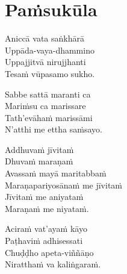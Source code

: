 
\clearpage

\section{Paṁsukūla}

\enlargethispage{\baselineskip}




Aniccā vata saṅkhārā\\
Uppāda-vaya-dhammino\\
Uppajjitvā nirujjhanti\\
Tesaṁ vūpasamo sukho.

Sabbe sattā maranti ca\\
Mariṁsu ca marissare\\
Tath'evāhaṁ marissāmi\\
N'atthi me ettha saṁsayo. 


Addhuvaṁ jīvitaṁ\\
Dhuvaṁ maraṇaṁ\\
Avassaṁ mayā maritabbaṁ\\
Maraṇapariyosānaṁ me jīvitaṁ\\
Jīvitaṁ me aniyataṁ\\
Maraṇaṁ me niyataṁ. 



Aciraṁ vat'ayaṁ kāyo\\
Paṭhaviṁ adhisessati\\
Chuḍḍho apeta-viññāṇo\\
Niratthaṁ va kaliṅgaraṁ. 


